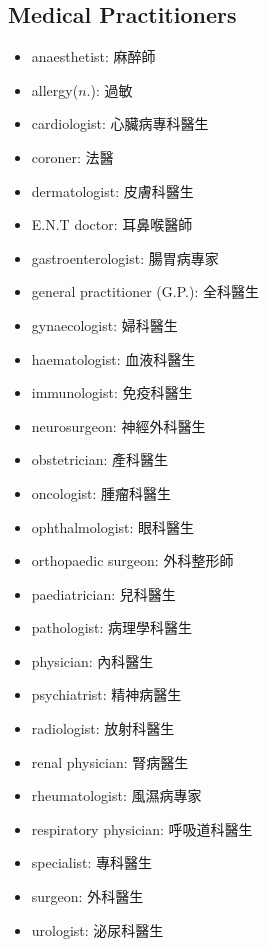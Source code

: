 \subsection{Medical Practitioners}
\begin{multicols}{2}
\begin{itemize}
  \itemsep0em
  \item anaesthetist: 麻醉師
  \item allergy($n.$): 過敏
  \item cardiologist: 心臟病專科醫生
  \item coroner: 法醫
  \item dermatologist: 皮膚科醫生
  \item E.N.T doctor: 耳鼻喉醫師
  \item gastroenterologist: 腸胃病專家
  \item general practitioner (G.P.): 全科醫生
  \item gynaecologist: 婦科醫生
  \item haematologist: 血液科醫生
  \item immunologist: 免疫科醫生
  \item neurosurgeon: 神經外科醫生
  \item obstetrician: 產科醫生
  \item oncologist: 腫瘤科醫生
  \item ophthalmologist: 眼科醫生
  \item orthopaedic surgeon: 外科整形師
  \item paediatrician: 兒科醫生
  \item pathologist: 病理學科醫生
  \item physician: 內科醫生
  \item psychiatrist: 精神病醫生
  \item radiologist: 放射科醫生
  \item renal physician: 腎病醫生
  \item rheumatologist: 風濕病專家
  \item respiratory physician: 呼吸道科醫生
  \item specialist: 專科醫生
  \item surgeon: 外科醫生
  \item urologist: 泌尿科醫生
\end{itemize}
\end{multicols}


